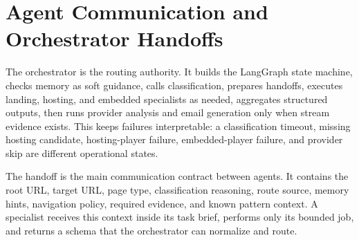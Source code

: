 \section{Agent Communication and Orchestrator Handoffs}

The orchestrator is the routing authority. It builds the LangGraph state machine,
checks memory as soft guidance, calls classification, prepares handoffs, executes
landing, hosting, and embedded specialists as needed, aggregates structured
outputs, then runs provider analysis and email generation only when stream
evidence exists. This keeps failures interpretable: a classification timeout,
missing hosting candidate, hosting-player failure, embedded-player failure, and
provider skip are different operational states.



The handoff is the main communication contract between agents. It contains the
root URL, target URL, page type, classification reasoning, route source, memory hints, navigation policy, required evidence, and known pattern context. A
specialist receives this context inside its task brief, performs only its
bounded job, and returns a schema that the orchestrator can normalize and route.

